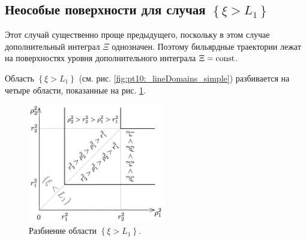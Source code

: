 \subsection{Неособые поверхности для случая $\left\{\xi > L_1\right\}$}\label{s3.9}
Этот случай существенно проще предыдущего, поскольку в этом случае дополнительный интеграл $\Xi$ однозначен. Поэтому бильярдные траектории лежат на поверхностях уровня дополнительного интеграла $\Xi=\mathrm{const}$.

Область $\left\{\xi > L_1 \right\}$ (см. рис. \ref{fig:pt10:_lineDomains_simple}) разбивается  на четыре области, показанные на рис. \ref{fig:pt10:_xiL1_subdivision}.
\begin{figure}[!htb]
\centering
\includegraphics[width=6cm]{images/section3_circular/sect3_xiL1_subdivision.pdf}
    \caption{Разбиение области $\left\{\xi > L_1\right\}$.}
    \label{fig:pt10:_xiL1_subdivision}
\end{figure}

